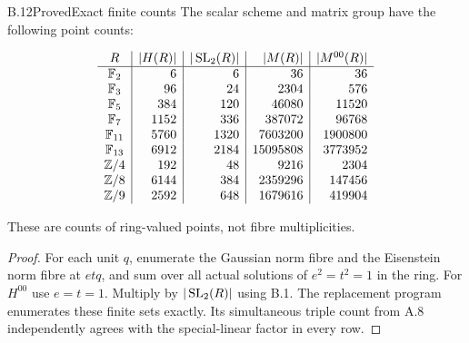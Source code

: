\begin{statement}{B.12}{Proved}{Exact finite counts}
The scalar scheme and matrix group have the following point counts:

$$
\begin{array}{c|r|r|r|r}
R&|H(R)|&|\operatorname{SL}_2(R)|&|M(R)|&|M^{00}(R)|\\\hline
\mathbb F_2&6&6&36&36\\
\mathbb F_3&96&24&2304&576\\
\mathbb F_5&384&120&46080&11520\\
\mathbb F_7&1152&336&387072&96768\\
\mathbb F_{11}&5760&1320&7603200&1900800\\
\mathbb F_{13}&6912&2184&15095808&3773952\\
\mathbb Z/4&192&48&9216&2304\\
\mathbb Z/8&6144&384&2359296&147456\\
\mathbb Z/9&2592&648&1679616&419904
\end{array}
$$

These are counts of ring-valued points, not fibre multiplicities.
\end{statement}
\begin{proof}
For each unit $q$, enumerate the Gaussian norm fibre and
the Eisenstein norm fibre at $etq$, and sum over all actual
solutions of $e^2=t^2=1$ in the ring.
For $H^{00}$ use $e=t=1$.
Multiply by $|\operatorname{SL}_2(R)|$ using B.1.
The replacement program enumerates these finite sets exactly.
Its simultaneous triple count from A.8 independently agrees
with the special-linear factor in every row.
\end{proof}

